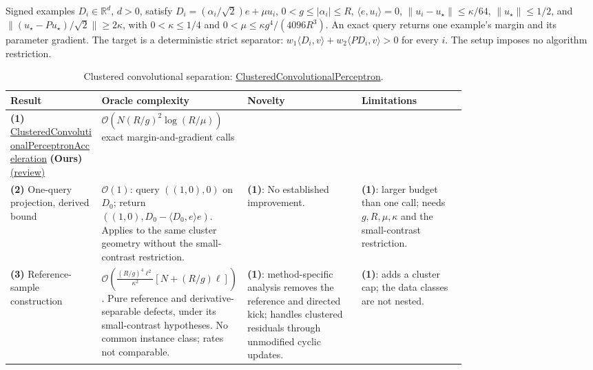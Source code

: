 \begin{table}[tp]
\centering
\caption{Clustered convolutional separation: \href{https://github.com/k3nfalt/longtails/blob/main/LongTails/Setups/ClusteredConvolutionalPerceptron.lean}{ClusteredConvolutionalPerceptron}.}\label{tab:ClusteredConvolutionalPerceptron}
\parbox{\linewidth}{\footnotesize Signed examples $D_i\in\mathbb R^d$, $d>0$, satisfy $D_i=(\alpha_i/\sqrt2)e+\mu u_i$, $0<g\le |\alpha_i|\le R$, $\langle e,u_i\rangle=0$, $\|u_i-u_\star\|\le\kappa/64$, $\|u_\star\|\le1/2$, and $\|(u_\star-Pu_\star)/\sqrt2\|\ge2\kappa$, with $0<\kappa\le1/4$ and $0<\mu\le\kappa g^4/(4096R^3)$. An exact query returns one example's margin and its parameter gradient. The target is a deterministic strict separator: $w_1\langle D_i,v\rangle+w_2\langle PD_i,v\rangle>0$ for every $i$. The setup imposes no algorithm restriction.}\par\smallskip
\begin{threeparttable}
\footnotesize
\setlength{\tabcolsep}{4pt}\renewcommand{\arraystretch}{1.25}
\begin{tabularx}{\linewidth}{@{}>{\raggedright\arraybackslash}p{0.20\linewidth}>{\raggedright\arraybackslash}p{0.32\linewidth}>{\raggedright\arraybackslash}p{0.25\linewidth}>{\raggedright\arraybackslash}X@{}}
\toprule
\textbf{Result} & \textbf{Oracle complexity} & \textbf{Novelty} & \textbf{Limitations} \\
\midrule
\textbf{(1)} \href{https://github.com/k3nfalt/longtails/blob/main/LongTails/Theorems/ClusteredConvolutionalPerceptronAcceleration.lean}{Clustered\allowbreak Convolutional\allowbreak Perceptron\allowbreak Acceleration} \textbf{(Ours)} \href{https://github.com/k3nfalt/longtails/blob/main/scripts/reviews/ClusteredConvolutionalPerceptronAcceleration.md}{(review)} & $\mathcal O\!\left(N(R/g)^2\log(R/\mu)\right)$ exact margin-and-gradient calls & & \\
\midrule[1.2pt]
\textbf{(2)} One-query projection, derived bound \citep{ccpOracleSource} & $\mathcal O(1)$: query $((1,0),0)$ on $D_0$; return $((1,0),D_0-\langle D_0,e\rangle e)$. Applies to the same cluster geometry without the small-contrast restriction. & \textbf{(1)}: No established improvement. & \textbf{(1)}: larger budget than one call; needs $g,R,\mu,\kappa$ and the small-contrast restriction. \\
\midrule
\textbf{(3)} Reference-sample construction \citep{ccpReferenceSource} & $\mathcal O\!\left(\frac{(R/g)^4\ell^2}{\kappa^2}\left[N+(R/g)\ell\right]\right)$. Pure reference and derivative-separable defects, under its small-contrast hypotheses. No common instance class; rates not comparable. & \textbf{(1)}: method-specific analysis removes the reference and directed kick; handles clustered residuals through unmodified cyclic updates. & \textbf{(1)}: adds a cluster cap; the data classes are not nested. \\

\end{tabularx}
\end{threeparttable}
\end{table}
